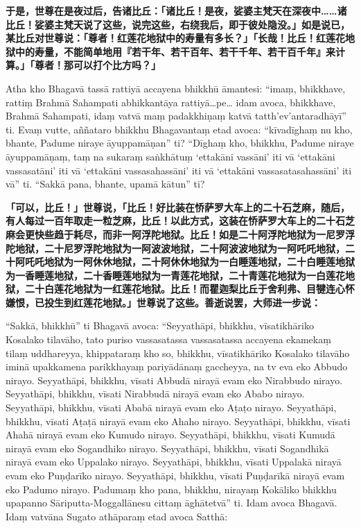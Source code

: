 \textbf{于是，世尊在是夜过后，告诸比丘：「诸比丘！是夜，娑婆主梵天在深夜中……诸比丘！娑婆主梵天说了这些，说完这些，右绕我后，即于彼处隐没。」如是说已，某比丘对世尊说：「尊者！红莲花地狱中的寿量有多长？」「长哉！比丘！红莲花地狱中的寿量，不能简单地用『若干年、若干百年、若干千年、若干百千年』来计算。」「尊者！那可以打个比方吗？」}

Atha kho Bhagavā tassā rattiyā accayena bhikkhū āmantesi: “imaṃ, bhikkhave, rattiṃ Brahmā Sahampati abhikkantāya rattiyā…pe… idam avoca, bhikkhave, Brahmā Sahampati, idaṃ vatvā maṃ padakkhiṇaṃ katvā tatth’ev’antaradhāyī” ti. Evaṃ vutte, aññataro bhikkhu Bhagavantaṃ etad avoca: “kīvadīghaṃ nu kho, bhante, Padume niraye āyuppamāṇan” ti? “Dīghaṃ kho, bhikkhu, Padume niraye āyuppamāṇaṃ, taṃ na sukaraṃ saṅkhātuṃ ‘ettakāni vassāni’ iti vā ‘ettakāni vassasatāni’ iti vā ‘ettakāni vassasahassāni’ iti vā ‘ettakāni vassasatasahassāni’ iti vā” ti. “Sakkā pana, bhante, upamā kātun” ti?

\textbf{「可以，比丘！」世尊说，「比丘！好比装在㤭萨罗大车上的二十石芝麻，随后，有人每过一百年取走一粒芝麻，比丘！以此方式，这装在㤭萨罗大车上的二十石芝麻会更快些趋于耗尽，而非一阿浮陀地狱。比丘！如是二十阿浮陀地狱为一尼罗浮陀地狱，二十尼罗浮陀地狱为一阿波波地狱，二十阿波波地狱为一阿吒吒地狱，二十阿吒吒地狱为一阿休休地狱，二十阿休休地狱为一白睡莲地狱，二十白睡莲地狱为一香睡莲地狱，二十香睡莲地狱为一青莲花地狱，二十青莲花地狱为一白莲花地狱，二十白莲花地狱为一红莲花地狱。比丘！而瞿迦梨比丘于舍利弗、目犍连心怀嫌恨，已投生到红莲花地狱。」世尊说了这些。善逝说罢，大师进一步说：}

“Sakkā, bhikkhū” ti Bhagavā avoca: “Seyyathāpi, bhikkhu, vīsatikhāriko Kosalako tilavāho, tato puriso vassasatassa vassasatassa accayena ekamekaṃ tilaṃ uddhareyya, khippataraṃ kho so, bhikkhu, vīsatikhāriko Kosalako tilavāho iminā upakkamena parikkhayaṃ pariyādānaṃ gaccheyya, na tv eva eko Abbudo nirayo. Seyyathāpi, bhikkhu, vīsati Abbudā nirayā evam eko Nirabbudo nirayo. Seyyathāpi, bhikkhu, vīsati Nirabbudā nirayā evam eko Ababo nirayo. Seyyathāpi, bhikkhu, vīsati Ababā nirayā evam eko Aṭaṭo nirayo. Seyyathāpi, bhikkhu, vīsati Aṭaṭā nirayā evam eko Ahaho nirayo. Seyyathāpi, bhikkhu, vīsati Ahahā nirayā evam eko Kumudo nirayo. Seyyathāpi, bhikkhu, vīsati Kumudā nirayā evam eko Sogandhiko nirayo. Seyyathāpi, bhikkhu, vīsati Sogandhikā nirayā evam eko Uppalako nirayo. Seyyathāpi, bhikkhu, vīsati Uppalakā nirayā evam eko Puṇḍarīko nirayo. Seyyathāpi, bhikkhu, vīsati Puṇḍarīkā nirayā evam eko Padumo nirayo. Padumaṃ kho pana, bhikkhu, nirayaṃ Kokāliko bhikkhu upapanno Sāriputta-Moggallānesu cittaṃ āghātetvā” ti. Idam avoca Bhagavā. Idaṃ vatvāna Sugato athāparaṃ etad avoca Satthā:

